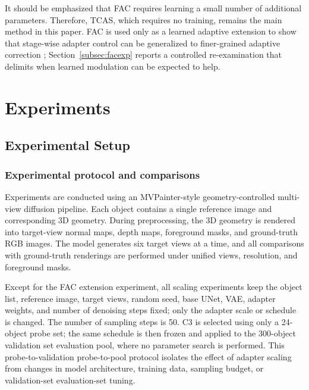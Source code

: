 \documentclass[times,twocolumn,final]{elsarticle}
\providecommand{\DIFadd}[1]{{\protect\color{blue} \sf #1}} %
\providecommand{\DIFdel}[1]{{\protect\color{red} \scriptsize #1}} %
\providecommand{\DIFaddbegin}{} %
\providecommand{\DIFaddend}{} %
\providecommand{\DIFdelbegin}{} %
\providecommand{\DIFdelend}{} %
\newcommand{\DIFscaledelfig}{0.5}
\newlength{\DIFdelgraphicswidth} %
\newlength{\DIFdelgraphicsheight} %
\newcommand{\DIFaddincludegraphics}[2][]{{\color{blue}\fbox{\DIFOincludegraphics[#1]{#2}}}} %
\newcommand{\DIFdelincludegraphics}[2][]{%
\sbox{\DIFdelgraphicsbox}{\DIFOincludegraphics[#1]{#2}}%
\settoboxwidth{\DIFdelgraphicswidth}{\DIFdelgraphicsbox} %
\settoboxtotalheight{\DIFdelgraphicsheight}{\DIFdelgraphicsbox} %
\scalebox{\DIFscaledelfig}{%
\parbox[b]{\DIFdelgraphicswidth}{\usebox{\DIFdelgraphicsbox}\\[-\baselineskip] \rule{\DIFdelgraphicswidth}{0em}}\llap{\resizebox{\DIFdelgraphicswidth}{\DIFdelgraphicsheight}{%
\setlength{\unitlength}{\DIFdelgraphicswidth}%
\begin{picture}(1,1)%
\thicklines\linethickness{2pt} %
{\color[rgb]{1,0,0}\put(0,0){\framebox(1,1){}}}%
{\color[rgb]{1,0,0}\put(0,0){\line( 1,1){1}}}%
{\color[rgb]{1,0,0}\put(0,1){\line(1,-1){1}}}%
\end{picture}%
}\hspace*{3pt}}} %
} %
\DeclareRobustCommand{\DIFaddbegin}{\DIFOaddbegin \let\includegraphics\DIFaddincludegraphics} %
\DeclareRobustCommand{\DIFaddend}{\DIFOaddend \let\includegraphics\DIFOincludegraphics} %
\DeclareRobustCommand{\DIFdelbegin}{\DIFOdelbegin \let\includegraphics\DIFdelincludegraphics} %
\DeclareRobustCommand{\DIFdelend}{\DIFOaddend \let\includegraphics\DIFOincludegraphics} %
\begin{document}
It should be emphasized that FAC requires learning a small number of additional parameters. Therefore, TCAS, which requires no training, remains the main method in this paper. FAC is used only as a learned adaptive extension\DIFdelbegin \DIFdel{to show that stage-wise adapter control can be generalized to finer-grained adaptive correction}\DIFdelend \DIFaddbegin \DIFadd{; Section~\ref{subsec:facexp} reports a controlled re-examination that delimits when learned modulation can be expected to help}\DIFaddend .

\section{Experiments}
\label{sec:experiments}

\subsection{Experimental Setup}
\label{subsec:setup}

\DIFaddbegin \subsubsection{\DIFadd{Experimental protocol and comparisons}}

\DIFaddend Experiments are conducted using an MVPainter-style geometry-controlled multi-view diffusion pipeline. Each object contains a single reference image and corresponding 3D geometry. During preprocessing, the 3D geometry is rendered into target-view normal maps, depth maps, foreground masks, and ground-truth RGB images. The model generates six target views at a time, and all comparisons with ground-truth renderings are performed under unified views, resolution, and foreground masks.

Except for the FAC extension experiment, all scaling experiments keep the object list, reference image, target views, random seed, base UNet, VAE, adapter weights, and number of denoising steps fixed; only the adapter scale or schedule is changed. The number of sampling steps is 50. C3 is selected using only a 24-object probe set; the same schedule is then frozen and applied to the 300-object \DIFdelbegin \DIFdel{validation set}\DIFdelend \DIFaddbegin \DIFadd{evaluation pool}\DIFaddend , where no parameter search is performed. This \DIFdelbegin \DIFdel{probe-to-validation }\DIFdelend \DIFaddbegin \DIFadd{probe-to-pool }\DIFaddend protocol isolates the effect of adapter scaling from changes in model architecture, training data, sampling budget, or \DIFdelbegin \DIFdel{validation-set }\DIFdelend \DIFaddbegin \DIFadd{evaluation-set }\DIFaddend tuning.
\end{document}
